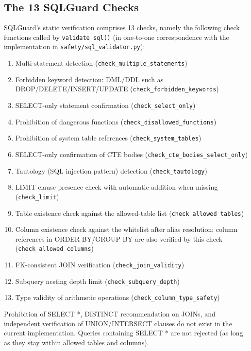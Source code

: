 \subsection{The 13 SQLGuard Checks}

SQLGuard's static verification comprises 13 checks, namely the following check functions called by \texttt{validate\_sql()} (in one-to-one correspondence with the implementation in \texttt{safety/sql\_validator.py}):

\begin{enumerate}[nosep]
  \item Multi-statement detection (\texttt{check\_multiple\_statements})
  \item Forbidden keyword detection: DML/DDL such as DROP/DELETE/INSERT/UPDATE (\texttt{check\_forbidden\_keywords})
  \item SELECT-only statement confirmation (\texttt{check\_select\_only})
  \item Prohibition of dangerous functions (\texttt{check\_disallowed\_functions})
  \item Prohibition of system table references (\texttt{check\_system\_tables})
  \item SELECT-only confirmation of CTE bodies (\texttt{check\_cte\_bodies\_select\_only})
  \item Tautology (SQL injection pattern) detection (\texttt{check\_tautology})
  \item LIMIT clause presence check with automatic addition when missing (\texttt{check\_limit})
  \item Table existence check against the allowed-table list (\texttt{check\_allowed\_tables})
  \item Column existence check against the whitelist after alias resolution; column references in ORDER BY/GROUP BY are also verified by this check (\texttt{check\_allowed\_columns})
  \item FK-consistent JOIN verification (\texttt{check\_join\_validity})
  \item Subquery nesting depth limit (\texttt{check\_subquery\_depth})
  \item Type validity of arithmetic operations (\texttt{check\_column\_type\_safety})
\end{enumerate}

Prohibition of SELECT *, DISTINCT recommendation on JOINs, and independent verification of UNION/INTERSECT clauses do not exist in the current implementation. Queries containing SELECT * are not rejected (as long as they stay within allowed tables and columns).

